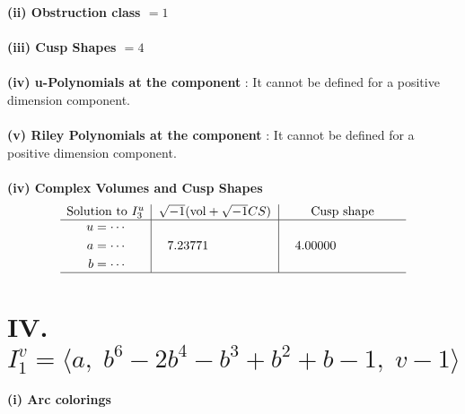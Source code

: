 \documentclass[1p]{elsarticle_modified}
\theoremstyle{definition}
\newcommand{\I}{\sqrt{-1}}
\begin{document}
\flushleft \textbf{(ii) Obstruction class $= 1$}\\~\\
\flushleft \textbf{(iii) Cusp Shapes $= 4$}\\~\\
\flushleft \textbf{(iv) u-Polynomials at the component} : It cannot be defined for a positive dimension component.\\~\\
\flushleft \textbf{(v) Riley Polynomials at the component} : It cannot be defined for a positive dimension component.\\~\\
\newpage\flushleft \textbf{(iv) Complex Volumes and Cusp Shapes}
$$\begin{array}{c|c|c} 
\text{Solution to }I^u_{3}& \I (\text{vol} + \sqrt{-1}CS) & \text{Cusp shape}\\
 \hline 
\begin{aligned}
u &= \cdots \\
a &= \cdots \\
b &= \cdots\end{aligned}
 & \phantom{-}7.23771\phantom{ +0.000000I} & \phantom{-}4.00000\phantom{ +0.000000I}\\
 \hline 
 \end{array}
$$\newpage\renewcommand{\arraystretch}{1}
\centering \section*{IV. $I^v_{1}= \langle a,\;b^6-2 b^4- b^3+b^2+b-1,\;v-1 \rangle$}
\flushleft \textbf{(i) Arc colorings}\\
\end{document}
